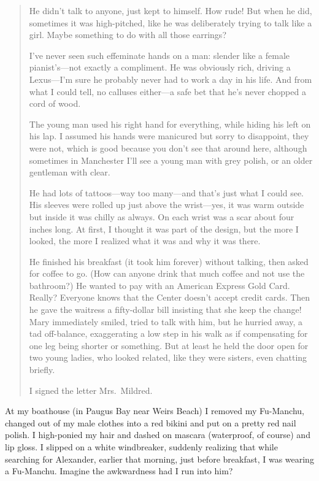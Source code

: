 \begin{quote}
He didn't talk to anyone, just kept to himself. How rude! But when he
did, sometimes it was high-pitched, like he was deliberately trying to
talk like a girl. Maybe something to do with all those earrings?

I've never seen such effeminate hands on a man: slender like a female
pianist's---not exactly a compliment. He was obviously rich, driving a
Lexus---I'm sure he probably never had to work a day in his life. And
from what I could tell, no calluses either---a safe bet that he's never
chopped a cord of wood.

The young man used his right hand for everything, while hiding his left
on his lap. I assumed his hands were manicured but sorry to disappoint,
they were not, which is good because you don't see that around here,
although sometimes in Manchester I'll see a young man with grey polish,
or an older gentleman with clear.

He had lots of tattoos---way too many---and that's just what I could
see. His sleeves were rolled up just above the wrist---yes, it was warm
outside but inside it was chilly as always. On each wrist was a scar
about four inches long. At first, I thought it was part of the design,
but the more I looked, the more I realized what it was and why it was
there.

He finished his breakfast (it took him forever) without talking, then
asked for coffee to go. (How can anyone drink that much coffee and not
use the bathroom?) He wanted to pay with an American Express Gold Card.
Really? Everyone knows that the Center doesn't accept credit cards. Then
he gave the waitress a fifty-dollar bill insisting that she keep the
change! Mary immediately smiled, tried to talk with him, but he hurried
away, a tad off-balance, exaggerating a low step in his walk as if
compensating for one leg being shorter or something. But at least he
held the door open for two young ladies, who looked related, like they
were sisters, even chatting briefly.

I signed the letter Mrs.~Mildred.
\end{quote}

At my boathouse (in Paugus Bay near Weirs Beach) I removed my Fu-Manchu,
changed out of my male clothes into a red bikini and put on a pretty red
nail polish. I high-ponied my hair and dashed on mascara (waterproof, of
course) and lip gloss. I slipped on a white windbreaker, suddenly
realizing that while searching for Alexander, earlier that morning, just
before breakfast, I was wearing a Fu-Manchu. Imagine the awkwardness had
I run into him?

